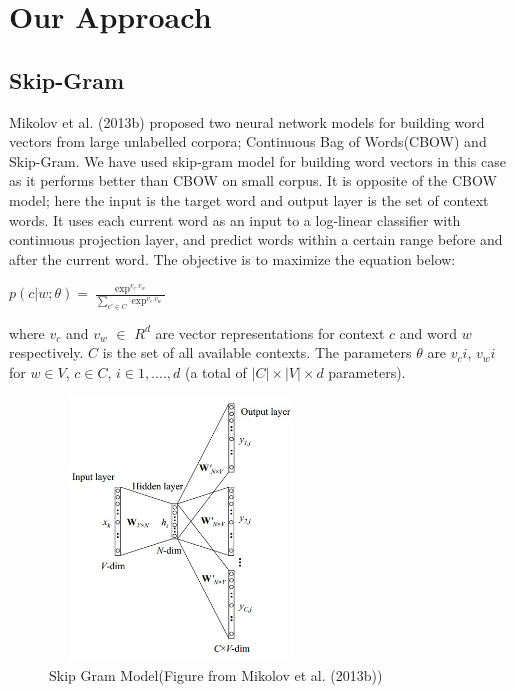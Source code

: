 \def\DevnagVersion{2.15}\documentclass[11pt]{article}
\begin{document}
\section{Our Approach}
\subsection{Skip-Gram}
Mikolov et al. (2013b) proposed two neural network models for building word vectors from large unlabelled corpora; Continuous Bag of Words(CBOW) and Skip-Gram. We have used skip-gram model for building word vectors in this case as it performs better than CBOW on small corpus. It is opposite of the CBOW model; here the input is the target word and output layer is the set of context words. It uses each current word as an input to a log-linear classifier with continuous projection layer, and predict words within a certain range before and after the current word. The objective is to maximize the equation below:
\begin{center} $p(c|w;\theta)=\frac{\exp^{v_c.v_w}}{\sum_{c' \in C}\exp^{v_c.v_w}}$ \end{center}
where $v_c$ and $v_w$ $\in$ $R^d$ are vector representations for context $c$ and word $w$ respectively. $C$ is the set of all available contexts. The parameters $\theta$ are $v_ci$, $v_wi$ for $w \in V$, $c \in C$, $i \in 1,....,d$ (a total of $|C| \times |V| \times d$ parameters).\\

\begin{figure}[ht!]
\centering
\includegraphics[width=70mm, height=70mm]{skipgram.jpg}
\caption{Skip Gram Model(Figure from Mikolov et al. (2013b)) \label{fig:skipgram}}
\end{figure}
\end{document}
